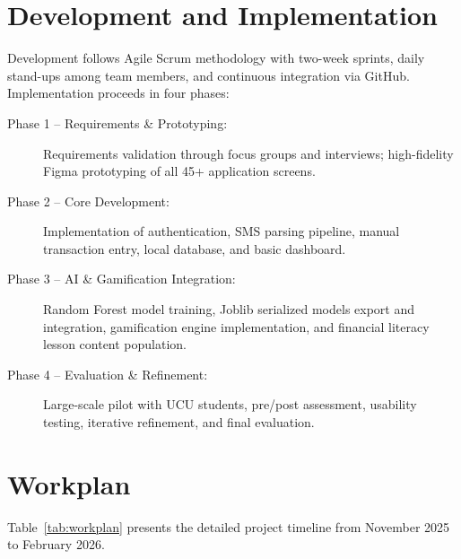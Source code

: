 \documentclass[12pt]{report}
\begin{document}
\section{Development and Implementation}

Development follows Agile Scrum methodology with two-week sprints, daily stand-ups
among team members, and continuous integration via GitHub. Implementation proceeds
in four phases:

\begin{description}
    \item[Phase 1 -- Requirements \& Prototyping:] Requirements validation through focus groups and interviews; high-fidelity Figma prototyping of all 45+ application screens.
    \item[Phase 2 -- Core Development:] Implementation of authentication, SMS parsing pipeline, manual transaction entry, local database, and basic dashboard.
    \item[Phase 3 -- AI \& Gamification Integration:] Random Forest model training, Joblib serialized models export and integration, gamification engine implementation, and financial literacy lesson content population.
    \item[Phase 4 -- Evaluation \& Refinement:] Large-scale pilot with UCU students, pre/post assessment, usability testing, iterative refinement, and final evaluation.
\end{description}

\section{Workplan}

Table~\ref{tab:workplan} presents the detailed project timeline from November 2025 to
February 2026.
\end{document}
